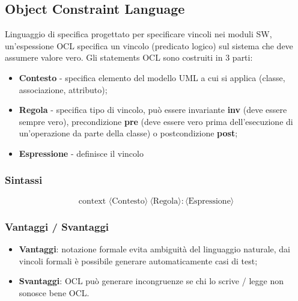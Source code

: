 \documentclass{article}
\begin{document}
    \subsection{Object Constraint Language}
      Linguaggio di specifica progettato per specificare vincoli nei moduli SW, un'espessione OCL specifica un vincolo (predicato logico) sul sistema che deve assumere valore vero. Gli statements OCL sono costruiti in 3 parti:
      \begin{itemize}
        \item \textbf{Contesto} - specifica elemento del modello UML a cui si applica (classe, associazione, attributo);
        \item \textbf{Regola} - specifica tipo di vincolo, può essere invariante \textbf{inv} (deve essere sempre vero), precondizione \textbf{pre} (deve essere vero prima dell'esecuzione di un'operazione da parte della classe) o postcondizione \textbf{post};
        \item \textbf{Espressione} - definisce il vincolo
      \end{itemize}
      \subsubsection{Sintassi}
        \[
        \text{context }\langle \text{Contesto} \rangle\ \langle \text{Regola} \rangle : \langle \text{Espressione} \rangle
        \]
      \subsubsection{Vantaggi / Svantaggi}
      \begin{itemize}
        \item \textbf{Vantaggi}: notazione formale evita ambiguità del linguaggio naturale, dai vincoli formali è possibile generare automaticamente casi di test;
        \item \textbf{Svantaggi}: OCL può generare incongruenze se chi lo scrive / legge non sonosce bene OCL.
      \end{itemize}
\end{document}
